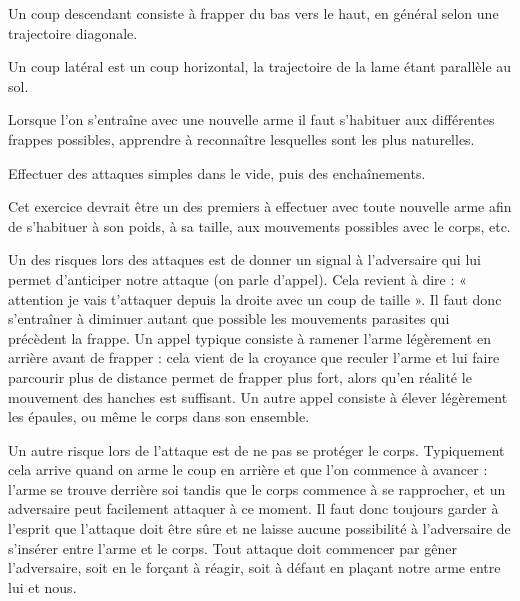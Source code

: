 \begin{coup}
\label{att:coup:montant}

Un coup descendant consiste à frapper du bas vers le haut, en général selon une trajectoire diagonale.
\end{coup}


\begin{coup}
\label{att:coup:latéral}

Un coup latéral est un coup horizontal, la trajectoire de la lame étant parallèle au sol.
\end{coup}


Lorsque l'on s'entraîne avec une nouvelle arme il faut s'habituer aux différentes frappes possibles, apprendre à reconnaître lesquelles sont les plus naturelles.


\begin{exercice}
Effectuer des attaques simples dans le vide, puis des enchaînements.

Cet exercice devrait être un des premiers à effectuer avec toute nouvelle arme afin de s'habituer à son poids, à sa taille, aux mouvements possibles avec le corps, etc.
\end{exercice}


Un des risques lors des attaques est de donner un signal à l'adversaire qui lui permet d'anticiper notre attaque (on parle d'appel).
Cela revient à dire : « attention je vais t'attaquer depuis la droite avec un coup de taille ».
Il faut donc s'entraîner à diminuer autant que possible les mouvements parasites qui précèdent la frappe.
Un appel typique consiste à ramener l'arme légèrement en arrière avant de frapper : cela vient de la croyance que reculer l'arme et lui faire parcourir plus de distance permet de frapper plus fort, alors qu'en réalité le mouvement des hanches est suffisant.
Un autre appel consiste à élever légèrement les épaules, ou même le corps dans son ensemble.

Un autre risque lors de l'attaque est de ne pas se protéger le corps.
Typiquement cela arrive quand on arme le coup en arrière et que l'on commence à avancer : l'arme se trouve derrière soi tandis que le corps commence à se rapprocher, et un adversaire peut facilement attaquer à ce moment.
Il faut donc toujours garder à l'esprit que l'attaque doit être sûre et ne laisse aucune possibilité à l'adversaire de s'insérer entre l'arme et le corps.
Tout attaque doit commencer par gêner l'adversaire, soit en le forçant à réagir, soit à défaut en plaçant notre arme entre lui et nous.

